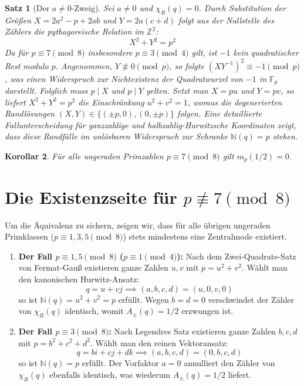 \documentclass[11pt,a4paper]{article}
\newtheorem{satz}{Satz}[section]
\newtheorem{korollar}[satz]{Korollar}
\begin{document}
\begin{satz}[Der $a \neq 0$-Zweig]
Sei $a \neq 0$ und $\chi_R(q) = 0$. Durch Substitution der Größen $X = 2a^2 - p + 2ab$ und $Y = 2a(c+d)$ folgt aus der Nullstelle des Zählers die pythagoreische Relation im $\mathbb{Z}^2$:
$$X^2 + Y^2 = p^2$$
Da für $p \equiv 7 \pmod 8$ insbesondere $p \equiv 3 \pmod 4$ gilt, ist $-1$ kein quadratischer Rest modulo $p$. Angenommen, $Y \not\equiv 0 \pmod p$, so folgte $(XY^{-1})^2 \equiv -1 \pmod p$, was einen Widerspruch zur Nichtexistenz der Quadratwurzel von $-1$ in $\mathbb{F}_p$ darstellt. Folglich muss $p \mid X$ und $p \mid Y$ gelten. Setzt man $X = pu$ und $Y = pv$, so liefert $X^2 + Y^2 = p^2$ die Einschränkung $u^2 + v^2 = 1$, woraus die degenerierten Randlösungen $(X, Y) \in \{(\pm p, 0), (0, \pm p)\}$ folgen. Eine detaillierte Fallunterscheidung für ganzzahlige und halbzahlig-Hurwitzsche Koordinaten zeigt, dass diese Randfälle im unlösbaren Widerspruch zur Schranke $\mathbb{N}(q) = p$ stehen.
\end{satz}

\begin{korollar}
Für alle ungeraden Primzahlen $p \equiv 7 \pmod 8$ gilt $m_p(1/2) = 0$.
\end{korollar}

\section{Die Existenzseite für $p \not\equiv 7 \pmod 8$}

Um die Äquivalenz zu sichern, zeigen wir, dass für alle übrigen ungeraden Primklassen ($p \equiv 1, 3, 5 \pmod 8$) stets mindestens eine Zentralmode existiert.

\begin{enumerate}
    \item \textbf{Der Fall $p \equiv 1, 5 \pmod 8$ ($p \equiv 1 \pmod 4$):}
    Nach dem Zwei-Quadrate-Satz von Fermat-Gauß existieren ganze Zahlen $u, v$ mit $p = u^2 + v^2$. Wählt man den kanonischen Hurwitz-Ansatz:
    $$q = u + vj \implies (a, b, c, d) = (u, 0, v, 0)$$
    so ist $\mathbb{N}(q) = u^2 + v^2 = p$ erfüllt. Wegen $b = d = 0$ verschwindet der Zähler von $\chi_R(q)$ identisch, womit $A_\pm(q) = 1/2$ erzwungen ist.
    
    \item \textbf{Der Fall $p \equiv 3 \pmod 8$:}
    Nach Legendres Satz existieren ganze Zahlen $b, c, d$ mit $p = b^2 + c^2 + d^2$. Wählt man den reinen Vektoransatz:
    $$q = bi + cj + dk \implies (a, b, c, d) = (0, b, c, d)$$
    so ist $\mathbb{N}(q) = p$ erfüllt. Der Vorfaktor $a = 0$ annulliert den Zähler von $\chi_R(q)$ ebenfalls identisch, was wiederum $A_\pm(q) = 1/2$ liefert.
\end{enumerate}
\end{document}
